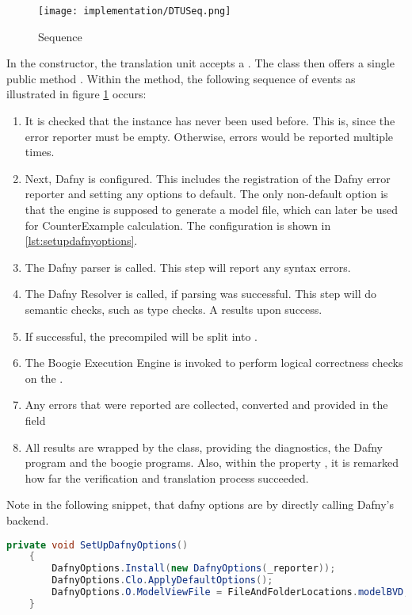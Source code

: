 \begin{figure}[H]
    \centering
    \texttt{[image: implementation/DTUSeq.png]}
    \caption{ Sequence}
    \label{fig:DTUSeq}
\end{figure}

In the constructor, the translation unit accepts a .
The class then offers a single public method .
Within the method, the following sequence of events as illustrated in figure \ref{fig:DTUSeq} occurs:

\begin{enumerate}
    \item It is checked that the instance has never been used before.
    This is, since the error reporter must be empty.
    Otherwise, errors would be reported multiple times.
    \item Next, Dafny is configured.
    This includes the registration of the Dafny error reporter and setting any options to default.
    The only non-default option is that the engine is supposed to generate a model file, which can later be used for CounterExample calculation.
    The configuration is shown in \ref{lst:setupdafnyoptions}.
    \item The Dafny parser is called.
    This step will report any syntax errors.
    \item The Dafny Resolver is called, if parsing was successful.
    This step will do semantic checks, such as type checks.
    A  results upon success.
    \item If successful, the precompiled  will be split into .
    \item The Boogie Execution Engine is invoked to perform logical correctness checks on the .
    \item Any errors that were reported are collected, converted and provided in the field 
    \item All results are wrapped by the  class, providing the diagnostics, the Dafny program and the boogie programs.
    Also, within the property , it is remarked how far the verification and translation process succeeded.
\end{enumerate}


Note in the following snippet, that dafny options are by directly calling Dafny's backend.
\begin{lstlisting}[language=csharp, caption={Setting up Dafny Options}, captionpos=b, label={lst:setupdafnyoptions}]
    private void SetUpDafnyOptions()
    {
        DafnyOptions.Install(new DafnyOptions(_reporter));
        DafnyOptions.Clo.ApplyDefaultOptions();
        DafnyOptions.O.ModelViewFile = FileAndFolderLocations.modelBVD;
    }
\end{lstlisting}


